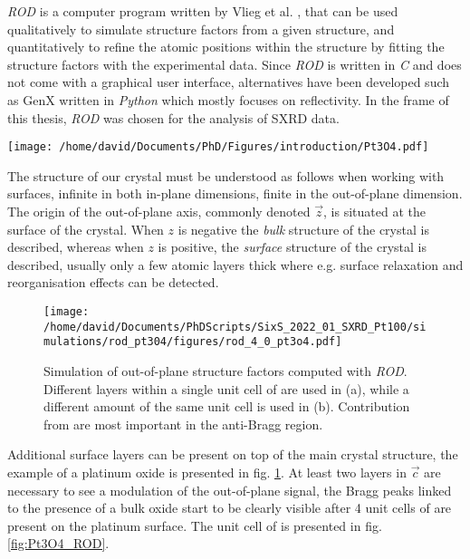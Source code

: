 \textit{ROD} is a computer program written by Vlieg et al. \parencite*{Vlieg2000}, that can be used qualitatively to simulate structure factors from a given structure, and quantitatively to refine the atomic positions within the structure by fitting the structure factors with the experimental data.
Since \textit{ROD} is written in \textit{C} and does not come with a graphical user interface, alternatives have been developed such as GenX \parencite{Bjorck2007, Glavic2022} written in \textit{Python} which mostly focuses on reflectivity.
In the frame of this thesis, \textit{ROD} was chosen for the analysis of SXRD data.

\begin{SCfigure}
    \centering
    \texttt{[image: /home/david/Documents/PhD/Figures/introduction/Pt3O4.pdf]}
    \caption{
         bulk unit cell.
        Platinum atoms are situated on the faces on the cubic unit cell (e.g. $(0, 1/2, 1/4)$, $(0, 1/2, 3/4)$), while the eight oxygen atoms are inside the unit cell at the positions $(1/4, 1/4, z)$, $(1/4, 2/4, z)$, $(2/4, 1/4, z)$, $(2/4, 2/4, z)$ for $z=1/4$ and $z=3/4$.
    }
    \label{fig:Pt3O4_ROD}
\end{SCfigure}

The structure of our crystal must be understood as follows when working with surfaces, infinite in both in-plane dimensions, finite in the out-of-plane dimension.
The origin of the out-of-plane axis, commonly denoted $\vec{z}$, is situated at the surface of the crystal.
When $z$ is negative the \textit{bulk} structure of the crystal is described, whereas when $z$ is positive, the \textit{surface} structure of the crystal is described, usually only a few atomic layers thick where e.g. surface relaxation and reorganisation effects can be detected.

\begin{figure}[!htb]
    \texttt{[image: /home/david/Documents/PhDScripts/SixS\_2022\_01\_SXRD\_Pt100/simulations/rod\_pt304/figures/rod\_4\_0\_pt3o4.pdf]}
    \caption{
        Simulation of out-of-plane structure factors computed with \textit{ROD}.
        Different layers within a single unit cell of  are used in (a), while a different amount of the same  unit cell is used in (b).
        Contribution from  are most important in the anti-Bragg region.
    }
    \label{fig:SimROD}
\end{figure}

Additional surface layers can be present on top of the main crystal structure, the example of a  platinum oxide is presented in fig. \ref{fig:SimROD}.
At least two layers in $\vec{c}$ are necessary to see a modulation of the out-of-plane signal, the Bragg peaks linked to the presence of a bulk oxide start to be clearly visible after 4 unit cells of  are present on the platinum surface.
The unit cell of  is presented in fig. \ref{fig:Pt3O4_ROD}.

